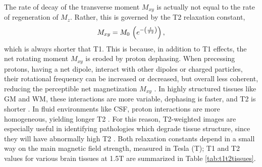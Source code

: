 \par
The rate of decay of the transverse moment $M_{xy}$ is actually not equal to the rate of regeneration of $M_z$. Rather, this is governed by the T2 relaxation constant,
\begin{equation}
M_{xy} = M_0\thinspace\left(e^{-\left(\frac{t}{T2}\right)}\right)\label{eq:T2},
\end{equation}
which is always shorter that T1. This is because, in addition to T1 effects, the net rotating moment $M_{xy}$ is eroded by proton dephasing. When precessing protons, having a net dipole, interact with other dipoles or charged particles, their rotational frequency can be increased or decreased, but overall less coherent, reducing the perceptible net magnetization $M_{xy}$ \cite{Bloch1946}. In highly structured tissues like GM and WM, these interactions are more variable, dephasing is faster, and T2 is shorter \cite{Roberts2007}. In fluid environments like CSF, proton interactions are more homogeneous, yielding longer T2 \cite{Roberts2007}. For this reason, T2-weighted images are especially useful in identifying pathologies which degrade tissue structure, since they will have abnormally high T2 \cite{Roberts2007}. Both relaxation constants depend in a small way on the main magnetic field strength, measured in Tesla (T); T1 and T2 values for various brain tissues at 1.5T are summarized in Table \ref{tab:t1t2tissues}.
\par
\begin{table}
  \caption{T1 and T2 constants for brain tissues at 1.5 Tesla.}
  \label{tab:t1t2tissues}
\end{table}
